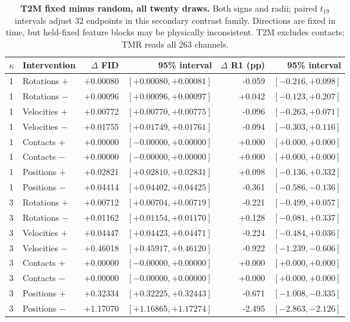 \begin{table}[t]
\centering\small
\caption{\textbf{T2M fixed minus random, all twenty draws.} Both signs and radii; paired $t_{19}$ intervals adjust 32 endpoints in this secondary contrast family. Directions are fixed in time, but held-fixed feature blocks may be physically inconsistent. T2M excludes contacts; TMR reads all 263 channels.}\label{tab:table_coherent_guo_contrast}
\begin{tabular}{@{}llrrrr@{}}\toprule
$\kappa$&Intervention&$\Delta$ FID&95\% interval&$\Delta$ R1 (pp)&95\% interval\\\midrule
1&Rotations $+$&+0.00080&$[+0.00080,+0.00081]$&-0.059&$[-0.216,+0.098]$\\
1&Rotations $-$&+0.00096&$[+0.00096,+0.00097]$&+0.042&$[-0.123,+0.207]$\\
1&Velocities $+$&+0.00772&$[+0.00770,+0.00775]$&-0.096&$[-0.263,+0.071]$\\
1&Velocities $-$&+0.01755&$[+0.01749,+0.01761]$&-0.094&$[-0.303,+0.116]$\\
1&Contacts $+$&+0.00000&$[-0.00000,+0.00000]$&+0.000&$[+0.000,+0.000]$\\
1&Contacts $-$&+0.00000&$[-0.00000,+0.00000]$&+0.000&$[+0.000,+0.000]$\\
1&Positions $+$&+0.02821&$[+0.02810,+0.02831]$&+0.098&$[-0.136,+0.332]$\\
1&Positions $-$&+0.04414&$[+0.04402,+0.04425]$&-0.361&$[-0.586,-0.136]$\\
3&Rotations $+$&+0.00712&$[+0.00704,+0.00719]$&-0.221&$[-0.499,+0.057]$\\
3&Rotations $-$&+0.01162&$[+0.01154,+0.01170]$&+0.128&$[-0.081,+0.337]$\\
3&Velocities $+$&+0.04447&$[+0.04423,+0.04471]$&-0.224&$[-0.484,+0.036]$\\
3&Velocities $-$&+0.46018&$[+0.45917,+0.46120]$&-0.922&$[-1.239,-0.606]$\\
3&Contacts $+$&+0.00000&$[-0.00000,+0.00000]$&+0.000&$[+0.000,+0.000]$\\
3&Contacts $-$&+0.00000&$[-0.00000,+0.00000]$&+0.000&$[+0.000,+0.000]$\\
3&Positions $+$&+0.32334&$[+0.32225,+0.32443]$&-0.671&$[-1.008,-0.335]$\\
3&Positions $-$&+1.17070&$[+1.16865,+1.17274]$&-2.495&$[-2.863,-2.126]$\\
\bottomrule\end{tabular}\end{table}
